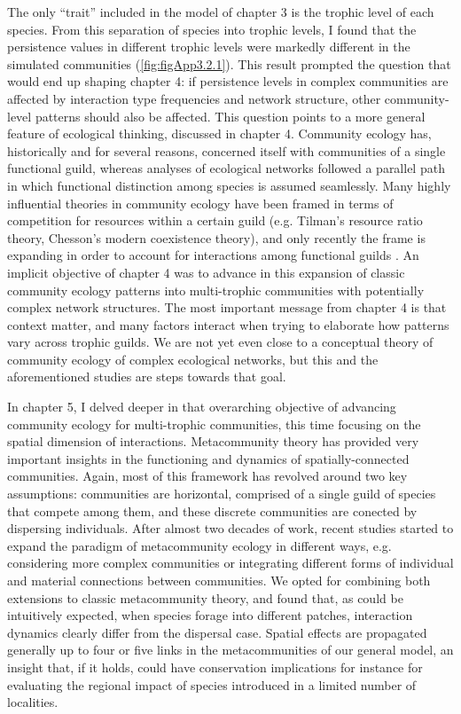 The only ``trait'' included in the model of chapter 3 is the trophic level of each species. From this separation of species into trophic levels, I found that the persistence values in different trophic levels were markedly different in the simulated communities (\cref{fig:figApp3.2.1}). This result prompted the question that would end up shaping chapter 4: if persistence levels in complex communities are affected by interaction type frequencies and network structure, other community-level patterns should also be affected. This question points to a more general feature of ecological thinking, discussed in chapter 4. Community ecology has, historically and for several reasons, concerned itself with communities of a single functional guild, whereas analyses of ecological networks followed a parallel path in which functional distinction among species is assumed seamlessly. Many highly influential theories in community ecology have been framed in terms of competition for resources within a certain guild (e.g. Tilman's resource ratio theory, Chesson's modern coexistence theory), and only recently the frame is expanding in order to account for interactions among functional guilds \citep{Chesson2008,Godoy2018, Seibold2018}. An implicit objective of chapter 4 was to advance in this expansion of classic community ecology patterns into multi-trophic communities with potentially complex network structures. The most important message from chapter 4 is that context matter, and many factors interact when trying to elaborate how patterns vary across trophic guilds. We are not yet even close to a conceptual theory of community ecology of complex ecological networks, but this and the aforementioned studies are steps towards that goal.

In chapter 5, I delved deeper in that overarching objective of advancing community ecology for multi-trophic communities, this time focusing on the spatial dimension of interactions. Metacommunity theory has provided very important insights in the functioning and dynamics of spatially-connected communities. Again, most of this framework has revolved around two key assumptions: communities are horizontal, comprised of a single guild of species that compete among them, and these discrete communities are conected by dispersing individuals. After almost two decades of work, recent studies started to expand the paradigm of metacommunity ecology in different ways, e.g. considering more complex communities or integrating different forms of individual and material connections between communities. We opted for combining both extensions to classic metacommunity theory, and found that, as could be intuitively expected, when species forage into different patches, interaction dynamics clearly differ from the dispersal case. Spatial effects are propagated generally up to four or five links in the metacommunities of our general model, an insight that, if it holds, could have conservation implications for instance for evaluating the regional impact of species introduced in a limited number of localities.

